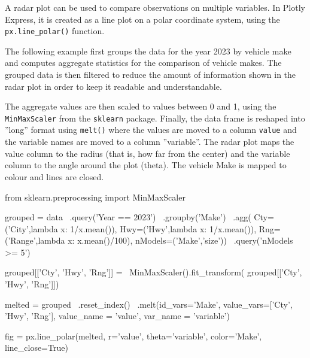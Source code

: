 A radar plot can be used to compare observations on multiple variables. In Plotly Express, it is created as a line plot on a polar coordinate system, using the \texttt{px.line\_polar()} function. 

The following example first groups the data for the year 2023 by vehicle make and computes aggregate statistics for the comparison of vehicle makes. The grouped data is then filtered to reduce the amount of information shown in the radar plot in order to keep it readable and understandable. 

The aggregate values are then scaled to values between 0 and 1, using the \texttt{MinMaxScaler} from the \texttt{sklearn} package. Finally, the data frame is reshaped into ''long'' format using \texttt{melt()} where the values are moved to a column \texttt{value} and the variable names are moved to a column ''variable''. The radar plot maps the value column to the radius (that is, how far from the center) and the variable column to the angle around the plot (theta). The vehicle Make is mapped to colour and lines are closed. 

\begin{samepage}
\begin{pythoncode}
from sklearn.preprocessing import MinMaxScaler

grouped = data \
  .query('Year == 2023') \
  .groupby('Make') \
  .agg(
      Cty=('City',lambda x: 1/x.mean()),
      Hwy=('Hwy',lambda x: 1/x.mean()),
      Rng=('Range',lambda x: x.mean()/100),
      nModels=('Make','size')) \
  .query('nModels >= 5')
  
grouped[['Cty', 'Hwy', 'Rng']] = \
  MinMaxScaler().fit_transform(
    grouped[['Cty', 'Hwy', 'Rng']])

melted = grouped \
  .reset_index() \
  .melt(id_vars='Make', 
        value_vars=['Cty', 'Hwy', 'Rng'],
        value_name = 'value',
        var_name = 'variable')
  
fig = px.line_polar(melted, 
     r='value', theta='variable', 
     color='Make', line_close=True)
\end{pythoncode}
\end{samepage}

